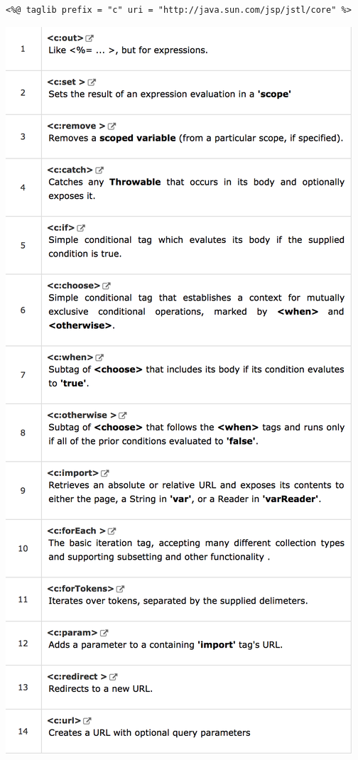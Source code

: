 \documentclass[11pt]{article}
\begin{document}
			\begin{lstlisting}
<%@ taglib prefix = "c" uri = "http://java.sun.com/jsp/jstl/core" %>
			\end{lstlisting}
\begin{center}
	\includegraphics[width=0.7\linewidth]{JSTL_Core}
\end{center}
\end{document}
